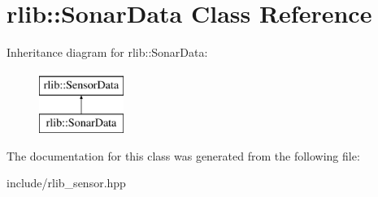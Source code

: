 \hypertarget{classrlib_1_1SonarData}{\section{rlib\-:\-:Sonar\-Data Class Reference}
\label{classrlib_1_1SonarData}
}
Inheritance diagram for rlib\-:\-:Sonar\-Data\-:\begin{figure}[H]
\begin{center}
\leavevmode
\includegraphics[height=2.000000cm]{classrlib_1_1SonarData}
\end{center}
\end{figure}


The documentation for this class was generated from the following file\-:\begin{DoxyCompactItemize}
\item 
include/rlib\-\_\-sensor.\-hpp\end{DoxyCompactItemize}
